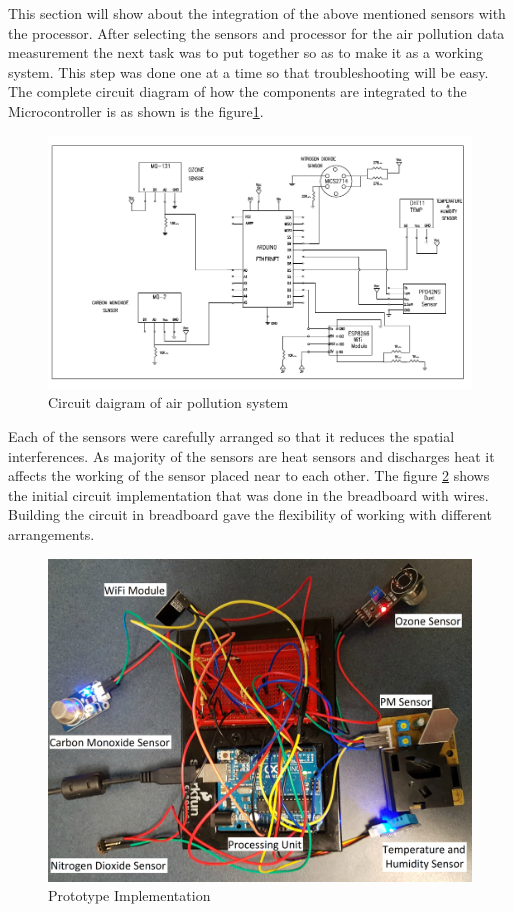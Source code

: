  This section will show about the integration of the above mentioned sensors with the processor. After selecting the sensors and processor for the air pollution data measurement the next task was to put together so as to make it as a working system. This step was done one at a time so that troubleshooting will be easy. The complete circuit diagram of how the components are integrated to the Microcontroller is as shown is the figure\ref{circuit}.
 \begin{figure}[h]
  \begin{center}
  \includegraphics[scale=0.80]{./images/figure5.png}
  \end{center}
  \caption{Circuit daigram of air pollution system}
  \label{circuit}
\end{figure}
 Each of the sensors were carefully arranged so that it reduces the spatial interferences. As majority of the sensors are heat sensors and discharges heat it affects the working of the sensor placed near to each other. The figure \ref{prototype} shows the initial circuit implementation that was done in the breadboard with wires. Building the circuit in breadboard gave the flexibility of working with different arrangements.

 \begin{figure}[h]
  \begin{center}
  \includegraphics[scale=0.09]{./images/figure14.jpg}
  \end{center}
  \caption{Prototype Implementation}
  \label{prototype}
\end{figure}

